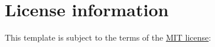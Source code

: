 
\section{License information}
\ifUseTsIndex
\fi

This template is subject to the terms of the \href{https://opensource.org/licenses/mit-license.php}{MIT license}:

\begin{figure}[H]
    \scriptsize
\end{figure}
